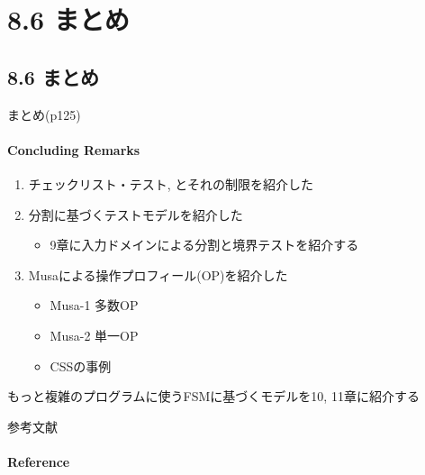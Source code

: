 \section{8.6 まとめ}
\subsection{8.6 まとめ}
\begin{frame}{まとめ(p125)}
\framesubtitle{Concluding Remarks}
\begin{enumerate}
\item チェックリスト・テスト, とそれの制限を紹介した
\item 分割に基づくテストモデルを紹介した
    \begin{itemize}
    \item 9章に入力ドメインによる分割と境界テストを紹介する
    \end{itemize}
\item Musaによる操作プロフィール(OP)を紹介した
    \begin{itemize}
    \item Musa-1 多数OP
    \item Musa-2 単一OP
    \item CSSの事例
    \end{itemize}
\end{enumerate}
もっと複雑のプログラムに使うFSMに基づくモデルを10, 11章に紹介する
\end{frame}

\appendix
\backupbegin
\begin{frame}{参考文献}
\framesubtitle{Reference}


\end{frame}
\backupend

